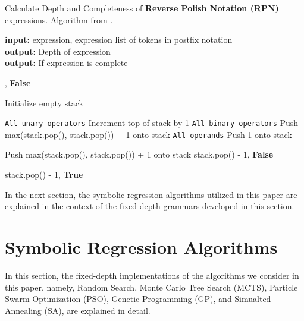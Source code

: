\documentclass[runningheads]{llncs}
\begin{document}
\begin{algorithm}
\scriptsize
\caption{Calculate Depth and Completeness of \textbf{Reverse Polish Notation (RPN)} expressions.  Algorithm from \cite{77128902}.}
\label{alg:getRPNdepth}
\hspace*{\algorithmicindent} \textbf{input:}  expression, expression list of tokens in postfix notation \\
\hspace*{\algorithmicindent} \textbf{output:} Depth of expression\\
\hspace*{\algorithmicindent} \textbf{output:} If expression is complete 
\begin{algorithmic}[1]
        \State {}, \textbf{False}
    \EndIf

    \State Initialize empty stack

         \Comment\texttt{{All unary operators}}
            \State Increment top of stack by 1 
         \Comment\texttt{{All binary operators}}
            \State Push max(stack.pop(), stack.pop()) + 1 onto stack 
        \Else  \Comment\texttt{{All operands}}
            \State Push 1 onto stack
        \EndIf
    \EndFor


	        \State Push max(stack.pop(), stack.pop()) + 1 onto  stack
	    \EndWhile
 	\State \Return stack.pop() - 1, \textbf{False}
    
    \Else
    	\State \Return stack.pop() - 1, \textbf{True}
    	    \EndIf
\EndFunction
\end{algorithmic}
\end{algorithm}

In the next section, the symbolic regression algorithms utilized in this paper are explained in the context of the fixed-depth grammars developed in this section.

\section{Symbolic Regression Algorithms}\label{sec:SymbolicRegressionAlgorithms}

In this section, the fixed-depth implementations of the algorithms we consider in this paper, namely, Random Search, Monte Carlo Tree Search (MCTS), Particle Swarm Optimization (PSO), Genetic Programming (GP), and Simualted Annealing (SA), are explained in detail.
\end{document}
